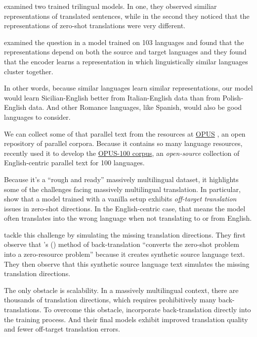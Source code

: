 \documentclass[10pt,letterpaper]{article}
\begin{document}
\citeauthor{johnson2017zeroshot} examined two trained trilingual models.
In one, they observed similiar representations of translated sentences,
while in the second they noticed that the representations of zero-shot translations were very different.
      
\citet{kudugunta2019investigating} examined the question in a model trained on 103 languages
and found that the representations depend on both the source and target languages
and they found that the encoder learns a representation in which 
linguistically similar languages cluster together.

In other words, because similar languages learn similar representations, our model would learn Sicilian-English 
better from Italian-English data than from Polish-English data.  And other Romance languages, like Spanish, would 
also be good languages to consider.

We can collect some of that parallel text from the resources at 
\href{http://opus.nlpl.eu/}{OPUS} \citep{tiedemann2012}, an open repository of parallel corpora.
Because it contains so many language resources,
\citet{zhang2020improving} recently used it to develop the 
\href{http://opus.nlpl.eu/opus-100.php}{OPUS-100 corpus}, an
\textit{open-source} collection of English-centric parallel text for 100 languages.

Because it's a ``rough and ready'' massively multilingual dataset, it highlights some of the challenges
facing massively multilingual translation.  In particular, \citeauthor{zhang2020improving}
show that a model trained with a vanilla setup exhibits \textit{off-target translation} issues
in zero-shot directions.  In the English-centric case, that means
the model often translates into	the wrong language when not translating to or from English.

\citeauthor{zhang2020improving} tackle this challenge by simulating the missing translation directions.
They first observe that \citeauthor{sennrich2015backtrans}'s (\citeyear{sennrich2015backtrans})
method of back-translation ``converts the zero-shot problem into a zero-resource problem''
because it creates synthetic source language text.  They then observe that this
synthetic source language text simulates the missing translation directions.

The only obstacle is scalability.  In a massively multilingual context, there are thousands of
translation directions, which requires prohibitively many back-translations.  To overcome this obstacle,
\citeauthor{zhang2020improving} incorporate back-translation directly into the training process.
And their final models exhibit improved translation quality and fewer off-target translation errors.
\end{document}
